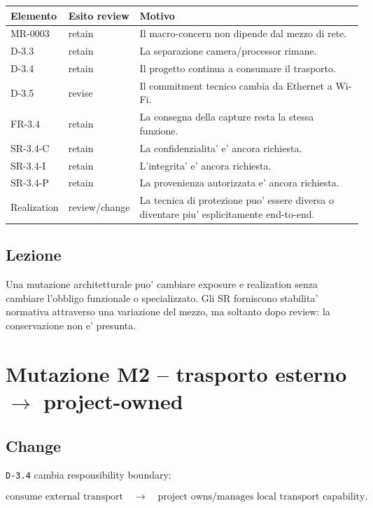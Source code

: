 \documentclass[11pt,a4paper]{article}
\begin{document}
\begin{longtable}{p{}p{}p{}}
\toprule
\textbf{Elemento} & \textbf{Esito review} & \textbf{Motivo} \\
\midrule
\endhead
MR-0003 & retain & Il macro-concern non dipende dal mezzo di rete. \\
D-3.3 & retain & La separazione camera/processor rimane. \\
D-3.4 & retain & Il progetto continua a consumare il trasporto. \\
D-3.5 & revise & Il commitment tecnico cambia da Ethernet a Wi-Fi. \\
FR-3.4 & retain & La consegna della capture resta la stessa funzione. \\
SR-3.4-C & retain & La confidenzialita' e' ancora richiesta. \\
SR-3.4-I & retain & L'integrita' e' ancora richiesta. \\
SR-3.4-P & retain & La provenienza autorizzata e' ancora richiesta. \\
Realization & review/change & La tecnica di protezione puo' essere diversa o diventare piu' esplicitamente end-to-end. \\
\bottomrule
\end{longtable}

\subsection{Lezione}

Una mutazione architetturale puo' cambiare exposure e realization senza cambiare l'obbligo funzionale o specializzato. Gli SR forniscono stabilita' normativa attraverso una variazione del mezzo, ma soltanto dopo review: la conservazione non e' presunta.

\section{Mutazione M2 -- trasporto esterno $\rightarrow$ project-owned}

\subsection{Change}

\texttt{D-3.4} cambia responsibility boundary:

\[
\text{consume external transport}
\quad\longrightarrow\quad
\text{project owns/manages local transport capability}.
\]
\end{document}
